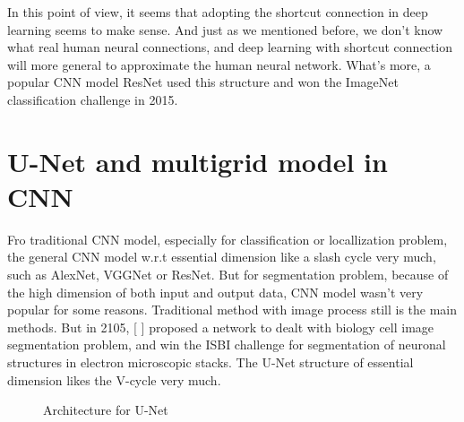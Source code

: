 In this point of view, it seems that adopting the shortcut connection in deep learning seems to make sense. And just as we mentioned before, we don't know what real human neural connections, and deep learning with shortcut connection will more general to approximate the human neural network. What's more, a popular CNN model ResNet used this structure and won the ImageNet classification challenge in 2015.

\section{U-Net and multigrid model in CNN}
Fro traditional CNN model, especially for classification or locallization problem, the general CNN model w.r.t essential dimension like a slash cycle very much, such as AlexNet, VGGNet or ResNet. But for segmentation problem, because of the high dimension of both input and output data, CNN model wasn't very popular for some reasons. Traditional method with image process still is the main methods. But in 2105, [ ] proposed a network to dealt with biology cell image segmentation problem, and win the ISBI challenge for segmentation of neuronal structures in electron microscopic stacks. The U-Net structure of essential dimension likes the V-cycle very much. 

\begin{figure}[!htb]        
	\caption{Architecture for U-Net}      
	\label{U-Net-model}
\end{figure}

\newpage